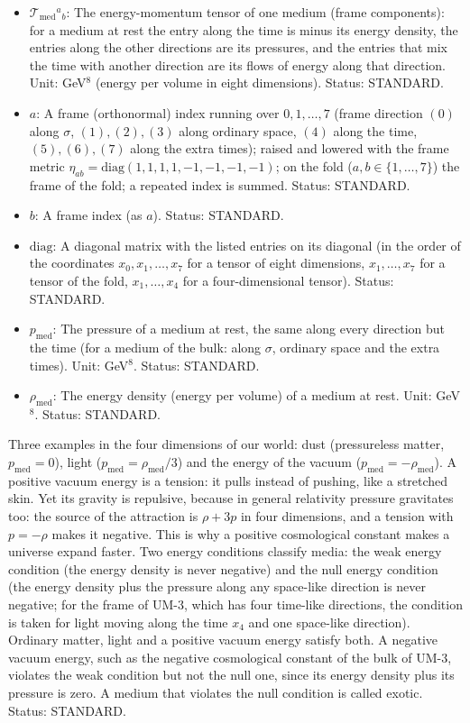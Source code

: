 \documentclass[
  10pt,
]{article}
\providecommand{\tightlist}{%
  \setlength{\itemsep}{0pt}\setlength{\parskip}{0pt}}
\begin{document}
\begin{itemize}
\tightlist
\item
  \(\mathcal{T}_{\mathrm{med}}{}^a{}_b\): The energy-momentum tensor of
  one medium (frame components): for a medium at rest the entry along
  the time is minus its energy density, the entries along the other
  directions are its pressures, and the entries that mix the time with
  another direction are its flows of energy along that direction. Unit:
  GeV\(^8\) (energy per volume in eight dimensions). Status: STANDARD.
\item
  \(a\): A frame (orthonormal) index running over \(0, 1, \dots, 7\)
  (frame direction \((0)\) along \(\sigma\), \((1), (2), (3)\) along
  ordinary space, \((4)\) along the time, \((5), (6), (7)\) along the
  extra times); raised and lowered with the frame metric
  \(\eta_{ab} = \mathrm{diag}(1, 1, 1, 1, -1, -1, -1, -1)\); on the fold
  (\(a, b \in \{1, \dots, 7\}\)) the frame of the fold; a repeated index
  is summed. Status: STANDARD.
\item
  \(b\): A frame index (as \(a\)). Status: STANDARD.
\item
  \(\mathrm{diag}\): A diagonal matrix with the listed entries on its
  diagonal (in the order of the coordinates \(x_0, x_1, \dots, x_7\) for
  a tensor of eight dimensions, \(x_1, \dots, x_7\) for a tensor of the
  fold, \(x_1, \dots, x_4\) for a four-dimensional tensor). Status:
  STANDARD.
\item
  \(p_{\mathrm{med}}\): The pressure of a medium at rest, the same along
  every direction but the time (for a medium of the bulk: along
  \(\sigma\), ordinary space and the extra times). Unit: GeV\(^8\).
  Status: STANDARD.
\item
  \(\rho_{\mathrm{med}}\): The energy density (energy per volume) of a
  medium at rest. Unit: GeV\(^8\). Status: STANDARD.
\end{itemize}

Three examples in the four dimensions of our world: dust (pressureless
matter, \(p_{\mathrm{med}} = 0\)), light
(\(p_{\mathrm{med}} = \rho_{\mathrm{med}}/3\)) and the energy of the
vacuum (\(p_{\mathrm{med}} = -\rho_{\mathrm{med}}\)). A positive vacuum
energy is a tension: it pulls instead of pushing, like a stretched skin.
Yet its gravity is repulsive, because in general relativity pressure
gravitates too: the source of the attraction is \(\rho + 3p\) in four
dimensions, and a tension with \(p = -\rho\) makes it negative. This is
why a positive cosmological constant makes a universe expand faster. Two
energy conditions classify media: the weak energy condition (the energy
density is never negative) and the null energy condition (the energy
density plus the pressure along any space-like direction is never
negative; for the frame of UM-3, which has four time-like directions,
the condition is taken for light moving along the time \(x_4\) and one
space-like direction). Ordinary matter, light and a positive vacuum
energy satisfy both. A negative vacuum energy, such as the negative
cosmological constant of the bulk of UM-3, violates the weak condition
but not the null one, since its energy density plus its pressure is
zero. A medium that violates the null condition is called exotic.
Status: STANDARD.
\end{document}
